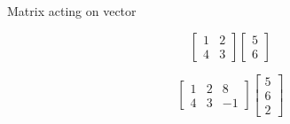 \documentclass{beamer}
\begin{document}
\begin{frame}{Matrix acting on vector}
  \begin{example}
    \begin{equation*}
      \left[\begin{array}{cc}
          1 & 2 \\
          4 & 3
        \end{array}\right]
      \left[\begin{array}{c}
          5 \\
          6
        \end{array}\right]
    \end{equation*}
  \end{example}
  \begin{example}
    \begin{equation*}
      \left[\begin{array}{ccc}
          1 & 2 & 8 \\
          4 & 3 & -1
        \end{array}\right]
      \left[\begin{array}{c}
          5 \\
          6 \\
          2
        \end{array}\right]
    \end{equation*}
  \end{example}
\end{frame}
\end{document}

